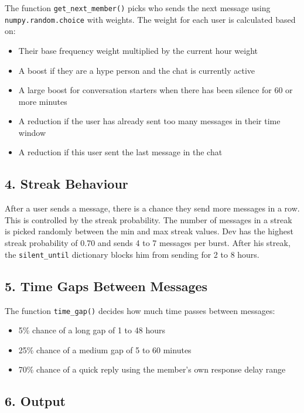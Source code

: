 \documentclass{article}
\begin{document}
The function \texttt{get\_next\_member()} picks who sends the next message using \texttt{numpy.random.choice} with weights. The weight for each user is calculated based on:

\begin{itemize}
    \item Their base frequency weight multiplied by the current hour weight
    \item A boost if they are a hype person and the chat is currently active
    \item A large boost for conversation starters when there has been silence for 60 or more minutes
    \item A reduction if the user has already sent too many messages in their time window
    \item A reduction if this user sent the last message in the chat
\end{itemize}

\subsection*{4. Streak Behaviour}

After a user sends a message, there is a chance they send more messages in a row. This is controlled by the streak probability. The number of messages in a streak is picked randomly between the min and max streak values. Dev has the highest streak probability of 0.70 and sends 4 to 7 messages per burst. After his streak, the \texttt{silent\_until} dictionary blocks him from sending for 2 to 8 hours.

\subsection*{5. Time Gaps Between Messages}

The function \texttt{time\_gap()} decides how much time passes between messages:

\begin{itemize}
    \item 5\% chance of a long gap of 1 to 48 hours
    \item 25\% chance of a medium gap of 5 to 60 minutes
    \item 70\% chance of a quick reply using the member's own response delay range
\end{itemize}

\subsection*{6. Output}
\end{document}
